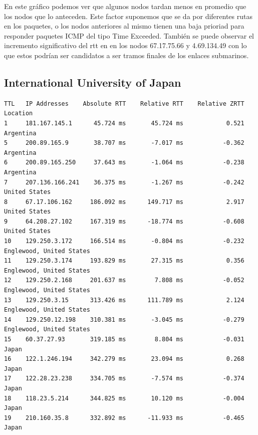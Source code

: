 \documentclass[10pt, a4paper]{article}
\begin{document}


En este gráfico podemos ver que algunos nodos tardan menos en promedio que los nodos que lo anteceden. Este factor suponemos que se da por diferentes rutas en los paquetes, o los nodos anteriores al mismo tienen una baja prioriad para responder paquetes ICMP del tipo Time Exceeded.
También se puede observar el incremento significativo del rtt en en los nodos 67.17.75.66 y 4.69.134.49 con lo que estos podrían ser candidatos a ser tramos finales de los enlaces submarinos. 

\subsection{International University of Japan}

\begin{verbatim}
TTL   IP Addresses    Absolute RTT    Relative RTT    Relative ZRTT  Location
1     181.167.145.1      45.724 ms       45.724 ms            0.521  Argentina
5     200.89.165.9       38.707 ms       -7.017 ms           -0.362  Argentina
6     200.89.165.250     37.643 ms       -1.064 ms           -0.238  Argentina
7     207.136.166.241    36.375 ms       -1.267 ms           -0.242  United States
8     67.17.106.162     186.092 ms      149.717 ms            2.917  United States
9     64.208.27.102     167.319 ms      -18.774 ms           -0.608  United States
10    129.250.3.172     166.514 ms       -0.804 ms           -0.232  Englewood, United States
11    129.250.3.174     193.829 ms       27.315 ms            0.356  Englewood, United States
12    129.250.2.168     201.637 ms        7.808 ms           -0.052  Englewood, United States
13    129.250.3.15      313.426 ms      111.789 ms            2.124  Englewood, United States
14    129.250.12.198    310.381 ms       -3.045 ms           -0.279  Englewood, United States
15    60.37.27.93       319.185 ms        8.804 ms           -0.031  Japan
16    122.1.246.194     342.279 ms       23.094 ms            0.268  Japan
17    122.28.23.238     334.705 ms       -7.574 ms           -0.374  Japan
18    118.23.5.214      344.825 ms       10.120 ms           -0.004  Japan
19    210.160.35.8      332.892 ms      -11.933 ms           -0.465  Japan
\end{verbatim}
\end{document}
